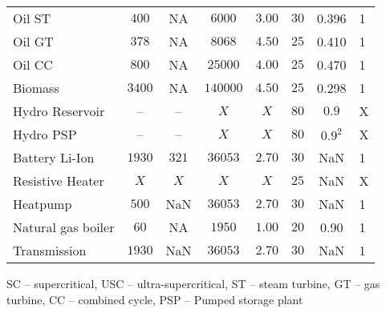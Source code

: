 \documentclass[final, 3p, times]{elsarticle} %
\begin{document}
\begin{table*}[h]
\begin{threeparttable}
\begin{tabulary}{0.5\textwidth}{lccccccl}
                Oil ST & $400$     & NA & $6000$    & $3.00$     & $30$ & 0.396 & 1 \\
                Oil GT & $378$     & NA & $8068$    & $4.50$     & $25$ & 0.410 & 1 \\
                Oil CC & $800$     & NA & $25000$   & $4.00$     & $25$ & 0.470 & 1 \\
                Biomass & $3400$    & NA & $140000$  & $4.50$     & $25$ & 0.298 & 1 \\ \midrule
                Hydro Reservoir & -- & -- & $X$       & $X$       & $80$ & $0.9$  & X \\
                Hydro PSP & -- & -- & $X$       & $X$       & $80$ & $0.9^2$ & X\\
                Battery Li-Ion & $1930$    & $321$ & $36053$   & $2.70$    & $30$ & NaN & 1 \\ \midrule
                Resistive Heater & $X$      & $X$   & $X$       & $X$       & $25$  & NaN & X \\
                Heatpump & $500$     & NaN & $36053$   & $2.70$    & $30$ & NaN & 1 \\
                Natural gas boiler & $60$   & NA & $1950$    & $1.00$    & $20$ & 0.90 & 1 \\ \midrule
                Transmission & $1930$    & NaN & $36053$   & $2.70$    & $30$ & NaN & 1 \\
                \bottomrule
            \end{tabulary}

            \begin{tablenotes}
                \item SC -- supercritical, USC -- ultra-supercritical, ST -- steam turbine, GT -- gas turbine,
                CC -- combined cycle, PSP -- Pumped storage plant
            \end{tablenotes}

        \end{threeparttable}
    \end{table*}
\end{document}
